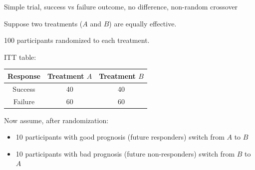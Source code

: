 \documentclass[ignorenonframetext,]{beamer}
\begin{document}
\begin{frame}{Simple trial, success vs failure outcome, no difference,
non-random crossover}

Suppose two treatments (\(A\) and \(B\)) are equally effective.

100 participants randomized to each treatment.

ITT table:

\begin{longtable}[c]{@{}ccc@{}}
\toprule
\begin{minipage}[b]{0.15\columnwidth}\centering\strut
Response
\strut\end{minipage} &
\begin{minipage}[b]{0.22\columnwidth}\centering\strut
Treatment \(A\)
\strut\end{minipage} &
\begin{minipage}[b]{0.25\columnwidth}\centering\strut
Treatment \(B\)
\strut\end{minipage}\tabularnewline
\midrule
\endhead
\begin{minipage}[t]{0.15\columnwidth}\centering\strut
Success
\strut\end{minipage} &
\begin{minipage}[t]{0.22\columnwidth}\centering\strut
40
\strut\end{minipage} &
\begin{minipage}[t]{0.25\columnwidth}\centering\strut
40
\strut\end{minipage}\tabularnewline
\begin{minipage}[t]{0.15\columnwidth}\centering\strut
Failure
\strut\end{minipage} &
\begin{minipage}[t]{0.22\columnwidth}\centering\strut
60
\strut\end{minipage} &
\begin{minipage}[t]{0.25\columnwidth}\centering\strut
60
\strut\end{minipage}\tabularnewline
\bottomrule
\end{longtable}

Now assume, after randomization:

\begin{itemize}
\item
  10 participants with good prognosis (future responders) switch from
  \(A\) to \(B\)
\item
  10 participants with bad prognosis (future non-responders) switch from
  \(B\) to \(A\)
\end{itemize}

\end{frame}
\end{document}

